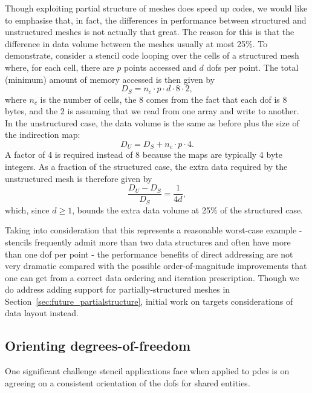Though exploiting partial structure of meshes does speed up codes, we would like to emphasise that, in fact, the differences in performance between structured and unstructured meshes is not actually that great.
The reason for this is that the difference in data volume between the meshes usually at most 25\%.
To demonstrate, consider a stencil code looping over the cells of a structured mesh where, for each cell, there are $p$ points accessed and $d$ \glspl{dof} per point.
The total (minimum) amount of memory accessed is then given by
\begin{equation*}
  D_S = n_c \cdot p \cdot d \cdot 8 \cdot 2,
\end{equation*}
where $n_c$ is the number of cells, the 8 comes from the fact that each \gls{dof} is 8 bytes, and the 2 is assuming that we read from one array and write to another.
In the unstructured case, the data volume is the same as before plus the size of the indirection map:
\begin{equation*}
  D_U = D_S + n_c \cdot p \cdot 4.
\end{equation*}
A factor of 4 is required instead of 8 because the maps are typically 4 byte integers.
As a fraction of the structured case, the extra data required by the unstructured mesh is therefore given by
\begin{equation*}
  \frac{D_U - D_S}{D_S} = \frac{1}{4d},
\end{equation*}
which, since $d \geq 1$, bounds the extra data volume at 25\% of the structured case.

Taking into consideration that this represents a reasonable worst-case example - stencils frequently admit more than two data structures and often have more than one \gls{dof} per point - the performance benefits of direct addressing are not very dramatic compared with the possible order-of-magnitude improvements that one can get from a correct data ordering and iteration prescription.
Though we do address adding support for partially-structured meshes in Section~\ref{sec:future_partialstructure}, initial work on  targets considerations of data layout instead.

\subsection{Orienting degrees-of-freedom}

One significant challenge stencil applications face when applied to \glspl{pde} is on agreeing on a consistent orientation of the \glspl{dof} for shared entities.

